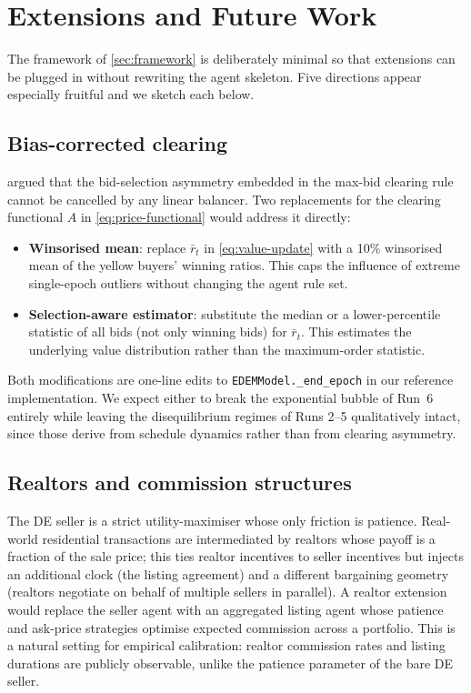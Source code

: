 \section{Extensions and Future Work}
\label{sec:extensions}

The framework of \cref{sec:framework} is deliberately minimal so that
extensions can be plugged in without rewriting the agent skeleton. Five
directions appear especially fruitful and we sketch each below.

\subsection{Bias-corrected clearing}
\label{sec:ext-clearing}

 argued that the bid-selection asymmetry
embedded in the max-bid clearing rule cannot be cancelled by any
linear balancer. Two replacements for the clearing functional $A$
in \cref{eq:price-functional} would address it directly:

\begin{itemize}[leftmargin=*,nosep]
\item \textbf{Winsorised mean}: replace $\bar{r}_{t}$ in
      \cref{eq:value-update} with a 10\% winsorised mean of the yellow
      buyers' winning ratios. This caps the influence of extreme
      single-epoch outliers without changing the agent rule set.
\item \textbf{Selection-aware estimator}: substitute the median or a
      lower-percentile statistic of all bids (not only winning bids)
      for $\bar{r}_{t}$. This estimates the underlying value
      distribution rather than the maximum-order statistic.
\end{itemize}

Both modifications are one-line edits to \texttt{EDEMModel.\_end\_epoch}
in our reference implementation. We expect either to break the
exponential bubble of Run~6 entirely while leaving the disequilibrium
regimes of Runs 2--5 qualitatively intact, since those derive from
schedule dynamics rather than from clearing asymmetry.

\subsection{Realtors and commission structures}
\label{sec:ext-realtors}

The DE seller is a strict utility-maximiser whose only friction is
patience. Real-world residential transactions are intermediated by
realtors whose payoff is a fraction of the sale price; this ties
realtor incentives to seller incentives but injects an additional
clock (the listing agreement) and a different bargaining geometry
(realtors negotiate on behalf of multiple sellers in parallel). A
realtor extension would replace the seller agent with an aggregated
listing agent whose patience and ask-price strategies optimise
expected commission across a portfolio. This is a natural setting
for empirical calibration: realtor commission rates and listing
durations are publicly observable, unlike the patience parameter of
the bare DE seller.

